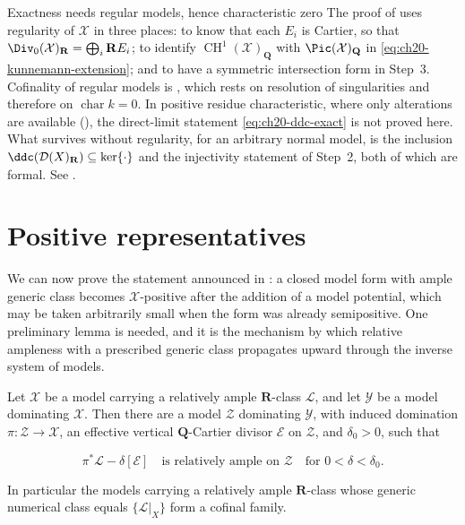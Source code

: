 \begin{warning}{Exactness needs regular models, hence characteristic zero}
The proof of  uses regularity of $\mathcal X$ in
three places: to know that each $E_i$ is Cartier, so that
$\Div_0(\mathcal X)_{\mathbf R}=\bigoplus_i\mathbf R E_i$; to identify
$\operatorname{CH}^1(\mathcal X)_{\mathbf Q}$ with
$\Pic(\mathcal X)_{\mathbf Q}$ in
\eqref{eq:ch20-kunnemann-extension}; and to have a symmetric intersection
form in Step~3.  Cofinality of regular models is
, which rests on resolution of singularities and
therefore on $\operatorname{char}k=0$.  In positive residue
characteristic, where only alterations are available
(), the direct-limit statement
\eqref{eq:ch20-ddc-exact} is not proved here.  What survives without
regularity, for an arbitrary normal model, is the inclusion
$\ddc(\mathcal D(X)_{\mathbf R})\subseteq\ker\{\cdot\}$ and the injectivity
statement of Step~2, both of which are formal.  See
.
\end{warning}

\section{Positive representatives}
\label{sec:ch20-positive-representative}

We can now prove the statement announced in
: a closed model form with ample generic
class becomes $\mathcal X$-positive after the addition of a model
potential, which may be taken arbitrarily small when the form was already
semipositive.  One preliminary lemma is needed, and it is the mechanism by
which relative ampleness with a prescribed generic class propagates upward
through the inverse system of models.

\begin{lemma}
\label{lem:ch20-ample-propagation}
Let $\mathcal X$ be a model carrying a relatively ample
$\mathbf R$-class $\mathcal L$, and let $\mathcal Y$ be a model
dominating $\mathcal X$.  Then there are a model $\mathcal Z$ dominating
$\mathcal Y$, with induced domination $\pi:\mathcal Z\to\mathcal X$, an
effective vertical $\mathbf Q$-Cartier divisor $\mathcal E$ on
$\mathcal Z$, and $\delta_0>0$, such that

\begin{equation}
\label{eq:ch20-ample-propagation}
 \pi^*\mathcal L-\delta[\mathcal E]
 \quad\text{is relatively ample on }\mathcal Z
 \quad\text{for }0<\delta<\delta_0 .
\end{equation}

In particular the models carrying a relatively ample $\mathbf R$-class
whose generic numerical class equals $\{\mathcal L|_X\}$ form a cofinal
family.
\end{lemma}

